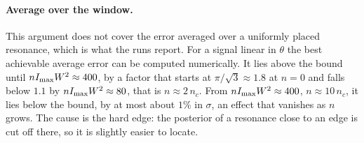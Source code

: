 \paragraph{Average over the window.} This argument does not cover the error averaged over a uniformly placed
resonance, which is what the runs report. For a signal linear in $\theta$ the best achievable average error can be
computed numerically. It lies above the bound until $nI_{\rm max}W^2\approx400$, by a factor that starts at
$\pi/\sqrt3\approx1.8$ at $n=0$ and falls below $1.1$ by $nI_{\rm max}W^2\approx80$, that is $n\approx2\,n_c$. From
$nI_{\rm max}W^2\approx400$, $n\approx10\,n_c$, it lies below the bound, by at most about $1\%$ in $\sigma$, an effect that vanishes as $n$ grows. The cause
is the hard edge: the posterior of a resonance close to an edge is cut off there, so it is slightly easier to locate.

